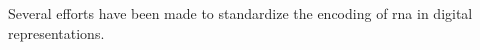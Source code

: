 


Several efforts have been made to standardize the encoding
of \gls{rna} in digital representations.
